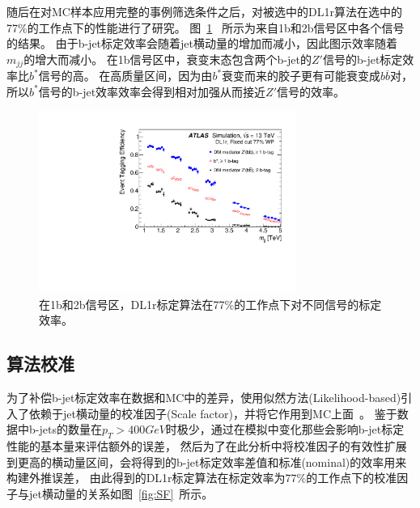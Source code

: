 随后在对MC样本应用完整的事例筛选条件之后，对被选中的DL1r算法在选中的77\%的工作点下的性能进行了研究。
图~\ref{fig:beff}~ 所示为来自1b和2b信号区中各个信号的结果。
由于b-jet标定效率会随着jet横动量的增加而减小，因此图示效率随着$m_{jj}$的增大而减小。
在1b信号区中，衰变末态包含两个b-jet的$Z'$信号的b-jet标定效率比$b^*$信号的高。
在高质量区间，因为由$b^*$衰变而来的胶子更有可能衰变成$b\overline{b}$对，所以$b^*$信号的b-jet效率效率会得到相对加强从而接近$Z'$信号的效率。　

\begin{figure}[htbp]
  \centering
  \includegraphics[width=0.75\textwidth]{figs/fig_02.pdf}
  \caption{在1b和2b信号区，DL1r标定算法在77\%的工作点下对不同信号的标定效率。}
  \label{fig:beff}
\end{figure}


\subsection{算法校准}
\label{sec:DijetBtagging4}

为了补偿b-jet标定效率在数据和MC中的差异，使用似然方法(Likelihood-based)引入了依赖于jet横动量的校准因子(Scale factor)，并将它作用到MC上面~\cite{FTAG-2018-01}。
鉴于数据中b-jets的数量在$p_{T}>400GeV$时极少，通过在模拟中变化那些会影响b-jet标定性能的基本量来评估额外的误差，
然后为了在此分析中将校准因子的有效性扩展到更高的横动量区间，会将得到的b-jet标定效率差值和标准(nominal)的效率用来构建外推误差，
由此得到的DL1r标定算法在标定效率为$77\%$的工作点下的校准因子与jet横动量的关系如图~\ref{fig:SF}~所示。



